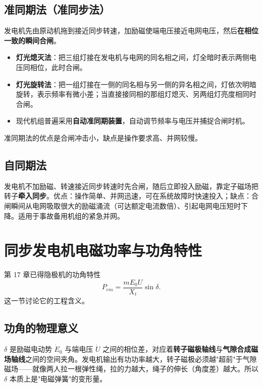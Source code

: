\subsection{准同期法（准同步法）}
发电机先由原动机拖到接近同步转速，加励磁使端电压接近电网电压，然后\textbf{在相位一致的瞬间合闸}。
\begin{itemize}
  \item \textbf{灯光熄灭法}：把三组灯接在发电机与电网的同名相之间，灯全暗时表示两侧电压同相位，此时合闸。
  \item \textbf{灯光旋转法}：把一组灯接在一侧的同名相与另一侧的异名相之间，灯依次明暗旋转，表示频率有微小差；当直接接同相的那组灯熄灭、另两组灯亮度相同时合闸。
  \item 现代机组普遍采用\textbf{自动准同期装置}，自动调节频率与电压并捕捉合闸时机。
\end{itemize}
准同期法的优点是合闸冲击小，缺点是操作要求高、并网较慢。

\subsection{自同期法}
发电机不加励磁、转速接近同步转速时先合闸，随后立即投入励磁，靠定子磁场把转子\textbf{牵入同步}。优点：操作简单、并网迅速，可在系统故障时快速投入；缺点：合闸瞬间从电网吸取很大的励磁涌流（可达额定电流数倍）、引起电网电压短时下降。适用于事故备用机组的紧急并网。


\section{同步发电机电磁功率与功角特性}

第 17 章已得隐极机的功角特性
\begin{equation}
P_{em}=\frac{mE_0U}{X_t}\sin\delta .
\end{equation}
这一节讨论它的工程含义。

\subsection{功角的物理意义}
$\delta$ 是励磁电动势 $\dot E_0$ 与端电压 $\dot U$ 之间的相位差，对应着\textbf{转子磁极轴线}与\textbf{气隙合成磁场轴线}之间的空间夹角。发电机输出有功功率越大，转子磁极必须越"超前"于气隙磁场——就像两人拉一根弹性绳，拉的力越大，绳子的伸长（角度差）越大。所以 $\delta$ 本质上是"电磁弹簧"的变形量。

